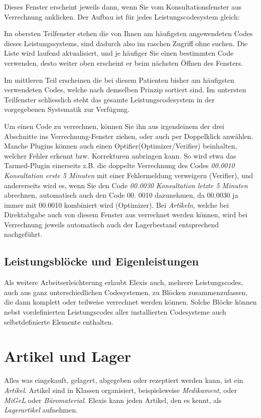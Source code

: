 Dieses Fenster erscheint jeweils dann, wenn Sie vom Konsultationsfenster aus \glqq{}Verrechnung\grqq{} anklicken. Der Aufbau ist für jedes Leistungscodesystem gleich:

Im obersten Teilfenster stehen die von Ihnen am häufigsten angewendeten Codes dieses Leistungssystems, sind dadurch also im raschen Zugriff ohne suchen. Die Liste wird laufend aktualisiert, und je häufiger Sie einen bestimmten Code verwenden, desto weiter oben erscheint er beim nächsten Öffnen des Fensters.

\medskip
Im mittleren Teil erscheinen die bei diesem Patienten bisher am häufigsten verwendeten Codes, welche nach demselben Prinzip sortiert sind. Im untersten Teilfenster schliesslich steht das gesamte Leistungscodesystem in der vorgegebenen Systematik zur Verfügung.

\bigskip

Um einen Code zu verrechnen, können Sie ihn  aus irgendeinem der drei Abschnitte ins Verrechnung-Fenster ziehen, oder auch per Doppelklick anwählen. Manche Plugins können auch einen \glqq Optifier\grqq (Optimizer/Verifier) beinhalten, welcher Fehler erkennt bzw. Korrekturen anbringen kann. So wird etwa das Tarmed-Plugin einerseits z.B. die doppelte Verrechnung des Codes \textit{00.0010 Konsultation erste 5 Minuten} mit einer Fehlermeldung verweigern (Verifier), und andererseits wird es, wenn Sie den Code \textit{00.0030 Konsultation letzte 5 Minuten} abrechnen, automatisch auch den Code 00. 0010 dazunehmen, da 00.0030 ja immer mit 00.0010 kombiniert wird (Optimizer).
Bei \textit{Artikeln}, welche bei Direktabgabe auch von diesem Fenster aus verrechnet werden können, wird bei Verrechnung jeweils automatisch auch der Lagerbestand entsprechend nachgeführt.

\subsection{Leistungsblöcke und Eigenleistungen}
Als weitere Arbeitserleichterung erlaubt Elexis auch, mehrere Leistungscodes, auch aus ganz unterschiedlichen Codesystemen, zu Blöcken zusammenzufassen, die dann komplett oder teilweise verrechnet werden können. Solche Blöcke können nebst vordefinierten Leistungscodes aller installierten Codesysteme auch selbstdefinierte Elemente enthalten.

\section{Artikel und Lager}
 Alles was eingekauft, gelagert, abgegeben oder rezeptiert werden kann, ist ein \textit{Artikel}.
 Artikel sind in Klassen organisiert, beispielsweise \textit{Medikament},
 oder \textit{MiGeL} oder \textit{Büromaterial}.
 Elexis kann jeden Artikel, den es kennt, als \textit{Lagerartikel} aufnehmen.

